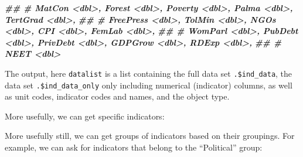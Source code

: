 \documentclass[
]{book}
\newenvironment{Shaded}{\begin{snugshade}}{\end{snugshade}}
\newcommand{\AttributeTok}[1]{\textcolor[rgb]{0.77,0.63,0.00}{#1}}
\newcommand{\CommentTok}[1]{\textcolor[rgb]{0.56,0.35,0.01}{\textit{#1}}}
\newcommand{\DocumentationTok}[1]{\textcolor[rgb]{0.56,0.35,0.01}{\textbf{\textit{#1}}}}
\newcommand{\FunctionTok}[1]{\textcolor[rgb]{0.00,0.00,0.00}{#1}}
\newcommand{\NormalTok}[1]{#1}
\newcommand{\OtherTok}[1]{\textcolor[rgb]{0.56,0.35,0.01}{#1}}
\newcommand{\SpecialCharTok}[1]{\textcolor[rgb]{0.00,0.00,0.00}{#1}}
\newcommand{\StringTok}[1]{\textcolor[rgb]{0.31,0.60,0.02}{#1}}
\begin{document}
\begin{Shaded}
\begin{Highlighting}[]
\DocumentationTok{\#\# \#   MatCon \textless{}dbl\textgreater{}, Forest \textless{}dbl\textgreater{}, Poverty \textless{}dbl\textgreater{}, Palma \textless{}dbl\textgreater{}, TertGrad \textless{}dbl\textgreater{},}
\DocumentationTok{\#\# \#   FreePress \textless{}dbl\textgreater{}, TolMin \textless{}dbl\textgreater{}, NGOs \textless{}dbl\textgreater{}, CPI \textless{}dbl\textgreater{}, FemLab \textless{}dbl\textgreater{},}
\DocumentationTok{\#\# \#   WomParl \textless{}dbl\textgreater{}, PubDebt \textless{}dbl\textgreater{}, PrivDebt \textless{}dbl\textgreater{}, GDPGrow \textless{}dbl\textgreater{}, RDExp \textless{}dbl\textgreater{},}
\DocumentationTok{\#\# \#   NEET \textless{}dbl\textgreater{}}
\end{Highlighting}
\end{Shaded}

The output, here \texttt{datalist} is a list containing the full data set \texttt{.\$ind\_data}, the data set \texttt{.\$ind\_data\_only} only including numerical (indicator) columns, as well as unit codes, indicator codes and names, and the object type.

More usefully, we can get specific indicators:

\begin{Shaded}
\end{Shaded}

More usefully still, we can get groups of indicators based on their groupings. For example, we can ask for indicators that belong to the ``Political'' group:
\end{document}
